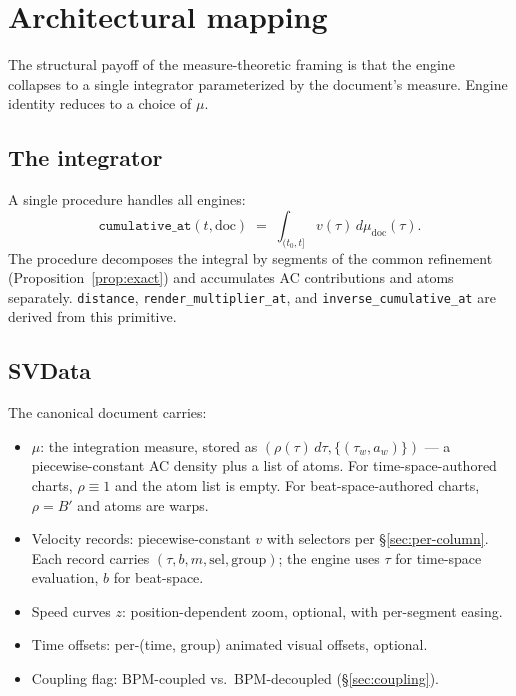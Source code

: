 \documentclass[11pt]{article}
\theoremstyle{definition}
\newcommand{\dtau}{\,d\tau}
\begin{document}
\section{Architectural mapping}
\label{sec:arch}

The structural payoff of the measure-theoretic framing is that the engine
collapses to a single integrator parameterized by the document's measure.
Engine identity reduces to a choice of $\mu$.

\subsection{The integrator}

A single procedure handles all engines:
\[
\texttt{cumulative\_at}(t, \mathrm{doc}) \;=\;
\int_{(t_0, t]} v(\tau)\, d\mu_{\mathrm{doc}}(\tau).
\]
The procedure decomposes the integral by segments of the common refinement
(Proposition~\ref{prop:exact}) and accumulates AC contributions and atoms
separately. \texttt{distance}, \texttt{render\_multiplier\_at}, and
\texttt{inverse\_cumulative\_at} are derived from this primitive.

\subsection{SVData}

The canonical document carries:
\begin{itemize}[leftmargin=2em]
    \item $\mu$: the integration measure, stored as
          $(\rho(\tau)\dtau, \{(\tau_w, a_w)\})$ --- a piecewise-constant AC
          density plus a list of atoms. For time-space-authored charts,
          $\rho \equiv 1$ and the atom list is empty. For beat-space-authored
          charts, $\rho = B'$ and atoms are warps.
    \item Velocity records: piecewise-constant $v$ with selectors per
          \S\ref{sec:per-column}. Each record carries $(\tau, b, m, \mathrm{sel}, \mathrm{group})$;
          the engine uses $\tau$ for time-space evaluation, $b$ for beat-space.
    \item Speed curves $z$: position-dependent zoom, optional, with
          per-segment easing.
    \item Time offsets: per-(time, group) animated visual offsets, optional.
    \item Coupling flag: BPM-coupled vs.\ BPM-decoupled
          (\S\ref{sec:coupling}).
\end{itemize}
\end{document}
